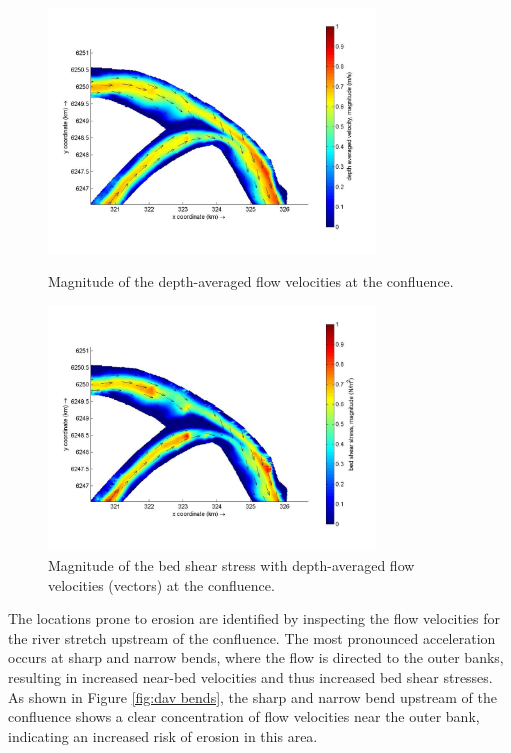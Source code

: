 \begin{figure}[H]
    \centering
    \begin{minipage}[t]{0.48\linewidth}
        \centering
        \includegraphics[height=6.5cm]{figures/ch7/dav_confluence.jpg}
        \caption{Magnitude of the depth-averaged flow velocities at the confluence.}
        \label{fig: dav confluence}
    \end{minipage}
    \hfill
    \begin{minipage}[t]{0.48\linewidth}
        \centering
        \includegraphics[height=6.5cm]{figures/ch7/Bed_shear_confluence.jpg}
        \caption{Magnitude of the bed shear stress with depth-averaged flow velocities (vectors) at the confluence.}
        \label{fig: bed shear confluence}
    \end{minipage}
\end{figure}

The locations prone to erosion are identified by inspecting the flow velocities for the river stretch upstream of the confluence. The most pronounced acceleration occurs at sharp and narrow bends, where the flow is directed to the outer banks, resulting in increased near-bed velocities and thus increased bed shear stresses. As shown in Figure \ref{fig:dav bends}, the sharp and narrow bend upstream of the confluence shows a clear concentration of flow velocities near the outer bank, indicating an increased risk of erosion in this area.

